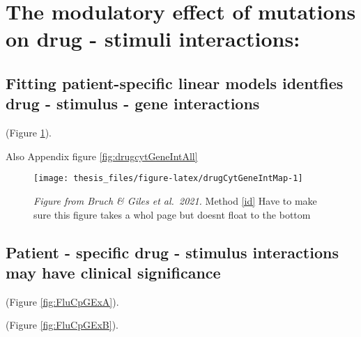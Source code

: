 \documentclass[11pt, a4paper, twosided]{book}
\begin{document}
\hypertarget{the-modulatory-effect-of-mutations-on-drug---stimuli-interactions}{%
\section{The modulatory effect of mutations on drug - stimuli interactions:}\label{the-modulatory-effect-of-mutations-on-drug---stimuli-interactions}}

\hypertarget{fitting-patient-specific-linear-models-identfies-drug---stimulus---gene-interactions}{%
\subsection{Fitting patient-specific linear models identfies drug - stimulus - gene interactions}\label{fitting-patient-specific-linear-models-identfies-drug---stimulus---gene-interactions}}

(Figure \ref{fig:drugCytGeneIntMap}).

Also Appendix figure \ref{fig:drugcytGeneIntAll}


\begin{figure}

{\centering \texttt{[image: thesis\_files/figure-latex/drugCytGeneIntMap-1]} 

}

\caption{\emph{Figure from Bruch \& Giles et al.~2021.} Method \ref{id} Have to make sure this figure takes a whol page but doesnt float to the bottom}\label{fig:drugCytGeneIntMap}
\end{figure}
\hypertarget{patient---specific-drug---stimulus-interactions-may-have-clinical-significance}{%
\subsection{Patient - specific drug - stimulus interactions may have clinical significance}\label{patient---specific-drug---stimulus-interactions-may-have-clinical-significance}}

(Figure \ref{fig:FluCpGExA}).



(Figure \ref{fig:FluCpGExB}).
\end{document}
